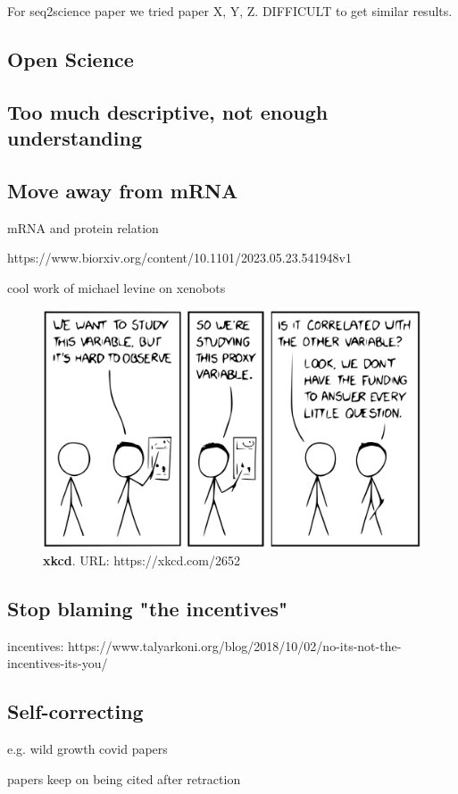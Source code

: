 For seq2science paper we tried paper X, Y, Z. DIFFICULT to get similar results.     

% 

\subsection{Open Science}

\subsection{Too much descriptive, not enough understanding}

\subsection{Move away from mRNA}

mRNA and protein relation

https://www.biorxiv.org/content/10.1101/2023.05.23.541948v1

cool work of michael levine on xenobots


\begin{figure}[H]
    \includegraphics[width=\linewidth]{ch.discussion/imgs/xkcd.png}
    \caption{\textbf{xkcd}. URL: https://xkcd.com/2652}
    \label{fig:xkcd}
\end{figure}

\subsection{Stop blaming "the incentives"}

incentives: https://www.talyarkoni.org/blog/2018/10/02/no-its-not-the-incentives-its-you/

\subsection{Self-correcting}

e.g. wild growth covid papers

papers keep on being cited after retraction

